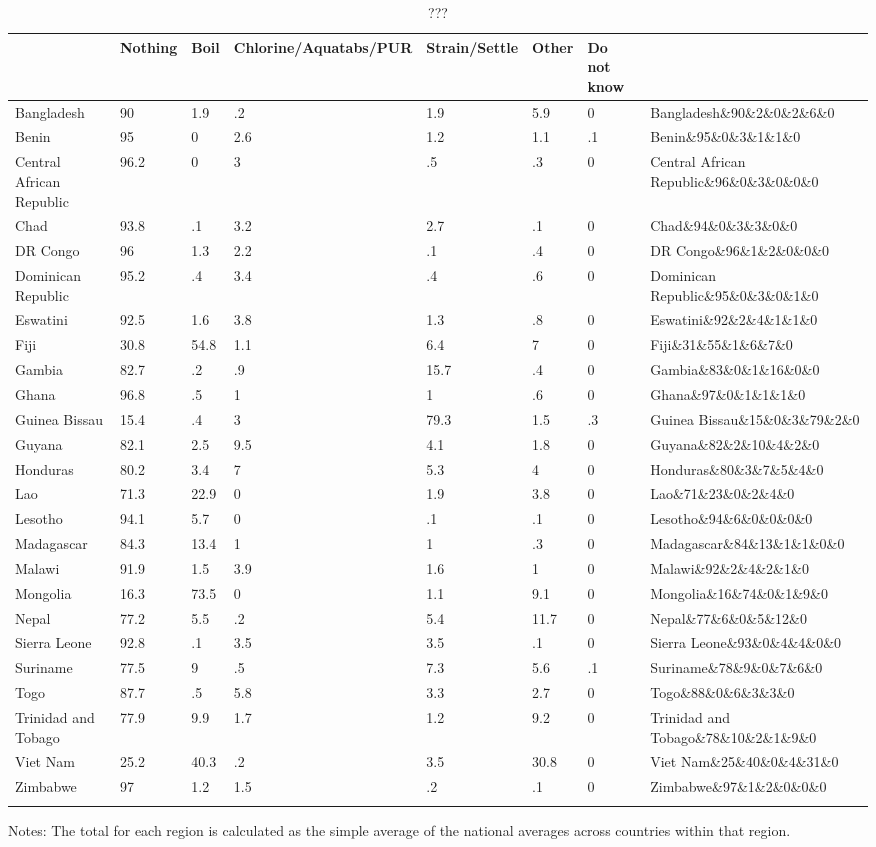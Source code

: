 \begin{table}[htbp] \centering
{}

\caption{???}
\label{Treat}
\begin{tabularx}{\linewidth}{lCCCCCCC}

\toprule
{}&{Nothing}&{Boil}&{Chlorine/Aquatabs/PUR}&{Strain/Settle}&{Other}&{Do not know}&{} \tabularnewline
\midrule \addlinespace[\belowrulesep]
Bangladesh&90&1.9&.2&1.9&5.9&0&Bangladesh\&90\&2\&0\&2\&6\&0 \tabularnewline
Benin&95&0&2.6&1.2&1.1&.1&Benin\&95\&0\&3\&1\&1\&0 \tabularnewline
Central African Republic&96.2&0&3&.5&.3&0&Central African Republic\&96\&0\&3\&0\&0\&0 \tabularnewline
Chad&93.8&.1&3.2&2.7&.1&0&Chad\&94\&0\&3\&3\&0\&0 \tabularnewline
DR Congo&96&1.3&2.2&.1&.4&0&DR Congo\&96\&1\&2\&0\&0\&0 \tabularnewline
Dominican Republic&95.2&.4&3.4&.4&.6&0&Dominican Republic\&95\&0\&3\&0\&1\&0 \tabularnewline
Eswatini&92.5&1.6&3.8&1.3&.8&0&Eswatini\&92\&2\&4\&1\&1\&0 \tabularnewline
Fiji&30.8&54.8&1.1&6.4&7&0&Fiji\&31\&55\&1\&6\&7\&0 \tabularnewline
Gambia&82.7&.2&.9&15.7&.4&0&Gambia\&83\&0\&1\&16\&0\&0 \tabularnewline
Ghana&96.8&.5&1&1&.6&0&Ghana\&97\&0\&1\&1\&1\&0 \tabularnewline
Guinea Bissau&15.4&.4&3&79.3&1.5&.3&Guinea Bissau\&15\&0\&3\&79\&2\&0 \tabularnewline
Guyana&82.1&2.5&9.5&4.1&1.8&0&Guyana\&82\&2\&10\&4\&2\&0 \tabularnewline
Honduras&80.2&3.4&7&5.3&4&0&Honduras\&80\&3\&7\&5\&4\&0 \tabularnewline
Lao&71.3&22.9&0&1.9&3.8&0&Lao\&71\&23\&0\&2\&4\&0 \tabularnewline
Lesotho&94.1&5.7&0&.1&.1&0&Lesotho\&94\&6\&0\&0\&0\&0 \tabularnewline
Madagascar&84.3&13.4&1&1&.3&0&Madagascar\&84\&13\&1\&1\&0\&0 \tabularnewline
Malawi&91.9&1.5&3.9&1.6&1&0&Malawi\&92\&2\&4\&2\&1\&0 \tabularnewline
Mongolia&16.3&73.5&0&1.1&9.1&0&Mongolia\&16\&74\&0\&1\&9\&0 \tabularnewline
Nepal&77.2&5.5&.2&5.4&11.7&0&Nepal\&77\&6\&0\&5\&12\&0 \tabularnewline
Sierra Leone&92.8&.1&3.5&3.5&.1&0&Sierra Leone\&93\&0\&4\&4\&0\&0 \tabularnewline
Suriname&77.5&9&.5&7.3&5.6&.1&Suriname\&78\&9\&0\&7\&6\&0 \tabularnewline
Togo&87.7&.5&5.8&3.3&2.7&0&Togo\&88\&0\&6\&3\&3\&0 \tabularnewline
Trinidad and Tobago&77.9&9.9&1.7&1.2&9.2&0&Trinidad and Tobago\&78\&10\&2\&1\&9\&0 \tabularnewline
Viet Nam&25.2&40.3&.2&3.5&30.8&0&Viet Nam\&25\&40\&0\&4\&31\&0 \tabularnewline
Zimbabwe&97&1.2&1.5&.2&.1&0&Zimbabwe\&97\&1\&2\&0\&0\&0 \tabularnewline
\bottomrule \addlinespace[\belowrulesep]

\end{tabularx}
\begin{flushleft}
\footnotesize Notes: The total for each region is calculated as the simple average of the national averages across countries within that region.
\end{flushleft}
\end{table}
